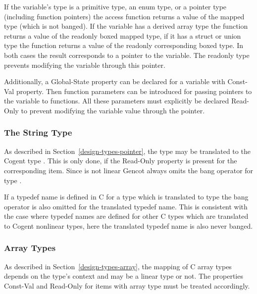 If the variable's type is a primitive type, an enum type, or a pointer type (including function pointers) the access 
function returns a value of the mapped type (which is not banged). If the variable has a derived array type the 
function returns a value of the readonly boxed mapped type, if it has a struct or union type the function returns a 
value of the readonly corresponding boxed type. In both cases the result corresponds to a pointer to the variable.
The readonly type prevents modifying the variable through this pointer.

Additionally, a Global-State property can be declared for a variable with Const-Val property. Then function parameters
can be introduced for passing pointers to the variable to functions. All these parameters must explicitly be
declared Read-Only to prevent modifying the variable value through the pointer.

\subsubsection{The String Type}

As described in Section~\ref{design-types-pointer}, the type  may be translated to the Cogent type .
This is only done, if the Read-Only property is present for the corresponding item. Since  is not linear
Gencot always omits the bang operator for type .

If a typedef name is defined in C for a type which is translated to type  the bang operator is also omitted
for the translated typedef name. This is consistent with the case where typedef names are defined for other C types which
are translated to Cogent nonlinear types, here the translated typedef name is also never banged.

\subsubsection{Array Types}

As described in Section~\ref{design-types-array}, the mapping of C array types depends on the type's context and may 
be a linear type or not. The properties Const-Val and Read-Only for items with array type must be treated accordingly.

